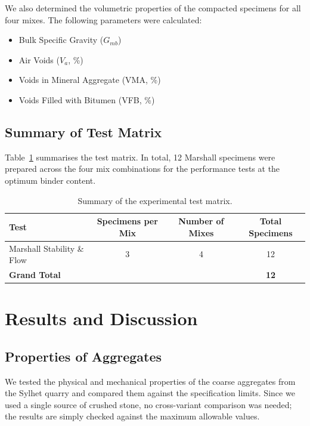\documentclass[12pt,a4paper]{article}
\begin{document}
We also determined the volumetric properties of the compacted specimens for all four mixes. The following parameters were calculated:

\begin{itemize}
    \item Bulk Specific Gravity ($G_{mb}$)
    \item Air Voids ($V_a$, \%)
    \item Voids in Mineral Aggregate (VMA, \%)
    \item Voids Filled with Bitumen (VFB, \%)
\end{itemize}

\subsection{Summary of Test Matrix}

Table~\ref{tab:test_matrix} summarises the test matrix. In total, 12 Marshall specimens were prepared across the four mix combinations for the performance tests at the optimum binder content.

\begin{table}[htbp]
    \centering
    \caption{Summary of the experimental test matrix.}
    \label{tab:test_matrix}
    \begin{tabular}{@{}lccc@{}}
        \toprule
        \textbf{Test} & \textbf{Specimens per Mix} & \textbf{Number of Mixes} & \textbf{Total Specimens} \\
        \midrule
        Marshall Stability \& Flow & 3 & 4 & 12 \\
        \midrule
        \textbf{Grand Total} & & & \textbf{12} \\
        \bottomrule
    \end{tabular}
\end{table}


\section{Results and Discussion}

\subsection{Properties of Aggregates}

We tested the physical and mechanical properties of the coarse aggregates from the Sylhet quarry and compared them against the specification limits. Since we used a single source of crushed stone, no cross-variant comparison was needed; the results are simply checked against the maximum allowable values.
\end{document}
